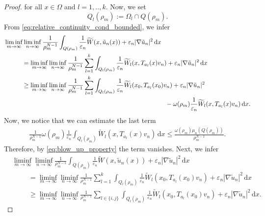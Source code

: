 \documentclass[a4paper, 11pt, reqno]{amsart}
\theoremstyle{plain}
\theoremstyle{definition}
\theoremstyle{remark}
\newcommand{\eps}{\varepsilon}
\begin{document}
\begin{proof}
    for all $x \in \Omega$ and $l = 1, .., k$.
    Now, we set $$Q_l(\rho_m) := \Omega_l \cap Q(\rho_m).$$ From \eqref{eq:relative_continuity_cond_bounded}, we infer
    \begin{align}\label{eq:liminf_partial_inequality_2}
        &\liminf_{m \to \infty} \liminf_{n \to \infty} \frac{1}{\rho_m^{N-1}} \int_{Q(\rho_m)} \frac{1}{\eps_n}\widetilde W(x, \tilde u_n(x)) + \eps_n |\nabla \tilde u_n|^2 \, \mathrm{d}x  \nonumber \\
        &\hspace{1 cm} = \liminf_{m \to \infty}  \liminf_{n \to \infty} \frac{1}{\rho_m^{N-1}} \sum_{l = 1}^k \int_{Q_l(\rho_m)} \frac{1}{\eps_n}\widetilde W_l(x, T_{a_l}(x)v_n) + \eps_n |\nabla \tilde u_n|^2 \, \mathrm{d}x \nonumber\\
        &\hspace{1 cm} \geq \liminf_{m \to \infty} \liminf_{n \to \infty} \frac{1}{\rho_m^{N-1}}\sum_{l = 1}^k \int_{Q_l(\rho_m)} \frac{1}{\eps_n}\widetilde W_l(x_0, T_{a_l}(x_0) v_n) + \eps_n |\nabla \tilde u_n|^2 \, \nonumber \\ 
        &\hspace{9 cm}- \omega(\rho_m)\frac{1}{\eps_n} \widetilde W_l(x, T_{a_l}(x)v_n)  \, \mathrm{d}x.
    \end{align}
    Now, we notice that we can estimate the last term  
    \begin{align*}
        \frac{1}{\rho_m^{N-1}}\omega(\rho_m)\frac{1}{\eps_n} \int_{Q_l(\rho_m)} \widetilde W_l(x, T_{a_l}(x)v_n)  \, \mathrm{d}x \leq \frac{\omega(\rho_m)\mu_n(Q(\rho_m))}{\rho_m^{N-1}}.
    \end{align*}
    Therefore, by \eqref{eq:blow_up_property} the term vanishes. Next, we infer 
    \begin{align}\label{eq:liminf_partial_inequality_3}
        &\liminf_{m \to \infty} \liminf_{n \to \infty} \frac{1}{\rho_m^{N-1}} \int_{Q(\rho_m)} \frac{1}{\eps_n}\widetilde W(x, \tilde u_n(x)) + \eps_n |\nabla \tilde u_n|^2 \, \mathrm{d}x  \nonumber \\
        & \hspace{1cm} =  \liminf_{m \to \infty} \liminf_{n \to \infty} \frac{1}{\rho_m^{N-1}}\sum_{l = 1}^k \int_{Q_l(\rho_m)} \frac{1}{\eps_n} \widetilde W_l(x_0, T_{a_l}(x_0) v_n) + \eps_n |\nabla \tilde u_n|^2 \, \mathrm{d}x \nonumber \\
        & \hspace{1cm} \geq  \liminf_{m \to \infty} \liminf_{n \to \infty} \frac{1}{\rho_m^{N-1}}\sum_{l \in \{i,j\}} \int_{Q_l(\rho_m)} \frac{1}{\eps_n} \widetilde W_l(x_0, T_{a_l}(x_0) v_n) + \eps_n |\nabla \tilde u_n|^2 \, \mathrm{d}x.

\end{align}
\end{proof}
\end{document}
